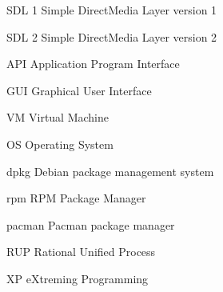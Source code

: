 \begin{siglas}
  \item[SDL 1] Simple DirectMedia Layer version 1
  \item[SDL 2] Simple DirectMedia Layer version 2
  \item[API] Application Program Interface
  \item[GUI] Graphical User Interface
  \item[VM] Virtual Machine
  \item[OS] Operating System
  \item[dpkg] Debian package management system
  \item[rpm] RPM Package Manager
  \item[pacman] Pacman package manager
  \item[RUP] Rational Unified Process
  \item[XP] eXtreming Programming
\end{siglas}
